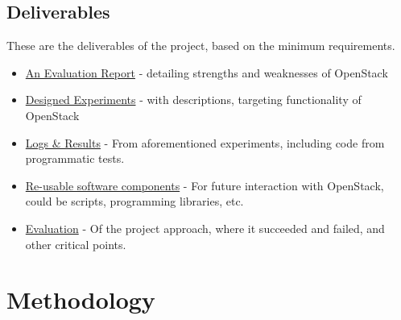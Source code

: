 \subsection{Deliverables}

These are the deliverables of the project, based on the minimum requirements. 
\begin{itemize}
\itemsep0em
\item \underline{An Evaluation Report} - detailing strengths and weaknesses of OpenStack
\item \underline{Designed Experiments} - with descriptions, targeting functionality of OpenStack
\item \underline{Logs \& Results} - From aforementioned experiments, including code from programmatic tests. 
\item \underline{Re-usable software components} - For future interaction with OpenStack, could be scripts, programming libraries, etc.
\item \underline{Evaluation} - Of the project approach, where it succeeded and failed, and other critical points.
\end{itemize}

\section{Methodology}
